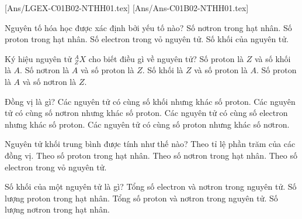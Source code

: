
 [Ans/LGEX-C01B02-NTHH01.tex]
 [Ans/Ans-C01B02-NTHH01.tex]
\begin{ex}%
	Nguyên tố hóa học được xác định bởi yếu tố nào?
	\choice
	{Số nơtron trong hạt nhân.}
	{\True Số proton trong hạt nhân.}
	{Số electron trong vỏ nguyên tử.}
	{Số khối của nguyên tử.}
\end{ex}
\begin{ex}%
	Ký hiệu nguyên tử $_{Z}^{A}X$ cho biết điều gì về nguyên tử?
	\choice
	{\True Số proton là $Z$ và số khối là $A$.}
	{Số nơtron là $A$ và số proton là $Z$.}
	{Số khối là $Z$ và số proton là $A$.}
	{Số proton là $A$ và số nơtron là $Z$.}
\end{ex}
\begin{ex}%
	Đồng vị là gì?
	\choice
	{Các nguyên tử có cùng số khối nhưng khác số proton.}
	{Các nguyên tử có cùng số nơtron nhưng khác số proton.}
	{Các nguyên tử có cùng số electron nhưng khác số proton.}
	{\True Các nguyên tử có cùng số proton nhưng khác số nơtron.}
\end{ex}
\begin{ex}%
	Nguyên tử khối trung bình được tính như thế nào?
	\choice
	{\True Theo tỉ lệ phần trăm của các đồng vị.}
	{Theo số proton trong hạt nhân.}
	{Theo số nơtron trong hạt nhân.}
	{Theo số electron trong vỏ nguyên tử.}
\end{ex}
\begin{ex}%
	Số khối của một nguyên tử là gì?
	\choice
	{Tổng số electron và nơtron trong nguyên tử.}
	{Số lượng proton trong hạt nhân.}
	{\True Tổng số proton và nơtron trong nguyên tử.}
	{Số lượng nơtron trong hạt nhân.}
\end{ex}
